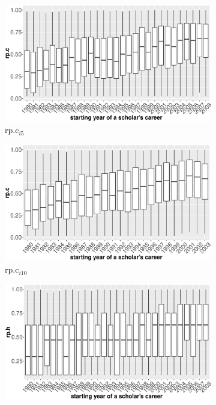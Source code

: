\begin{refsection}
\begin{figure}[h!]
     \centering
     \begin{subfigure}[b]{0.48\textwidth}
         \centering
         \includegraphics[width=\textwidth]{figures/exploratory/rpc_age5.eps}
         \caption{rp.c$_{i5}$}
     \end{subfigure}
     \hfill
     \begin{subfigure}[b]{0.48\textwidth}
         \centering
         \includegraphics[width=\textwidth]{figures/exploratory/rpc_age10.eps}
         \caption{rp.c$_{i10}$}
     \end{subfigure}
     \hfill
      \begin{subfigure}[b]{0.48\textwidth}
         \centering
         \includegraphics[width=\textwidth]{figures/exploratory/rph_age5.eps}

\end{subfigure}
\end{figure}
\end{refsection}
